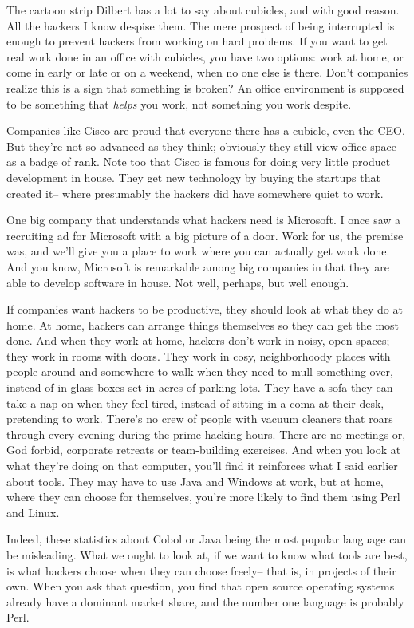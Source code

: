 \documentclass[12pt]{book}
\begin{document}
The cartoon strip Dilbert has a lot to say about cubicles, and with good
reason. All the hackers I know despise them. The mere prospect of being
interrupted is enough to prevent hackers from working on hard problems.
If you want to get real work done in an office with cubicles, you have
two options: work at home, or come in early or late or on a weekend,
when no one else is there. Don't companies realize this is a sign that
something is broken? An office environment is supposed to be something
that \emph{helps} you work, not something you work despite.

Companies like Cisco are proud that everyone there has a cubicle, even
the CEO. But they're not so advanced as they think; obviously they still
view office space as a badge of rank. Note too that Cisco is famous for
doing very little product development in house. They get new technology
by buying the startups that created it-- where presumably the hackers
did have somewhere quiet to work.

One big company that understands what hackers need is Microsoft. I once
saw a recruiting ad for Microsoft with a big picture of a door. Work for
us, the premise was, and we'll give you a place to work where you can
actually get work done. And you know, Microsoft is remarkable among big
companies in that they are able to develop software in house. Not well,
perhaps, but well enough.

If companies want hackers to be productive, they should look at what
they do at home. At home, hackers can arrange things themselves so they
can get the most done. And when they work at home, hackers don't work in
noisy, open spaces; they work in rooms with doors. They work in cosy,
neighborhoody places with people around and somewhere to walk when they
need to mull something over, instead of in glass boxes set in acres of
parking lots. They have a sofa they can take a nap on when they feel
tired, instead of sitting in a coma at their desk, pretending to work.
There's no crew of people with vacuum cleaners that roars through every
evening during the prime hacking hours. There are no meetings or, God
forbid, corporate retreats or team-building exercises. And when you look
at what they're doing on that computer, you'll find it reinforces what I
said earlier about tools. They may have to use Java and Windows at work,
but at home, where they can choose for themselves, you're more likely to
find them using Perl and Linux.

Indeed, these statistics about Cobol or Java being the most popular
language can be misleading. What we ought to look at, if we want to know
what tools are best, is what hackers choose when they can choose
freely-- that is, in projects of their own. When you ask that question,
you find that open source operating systems already have a dominant
market share, and the number one language is probably Perl.
\end{document}
